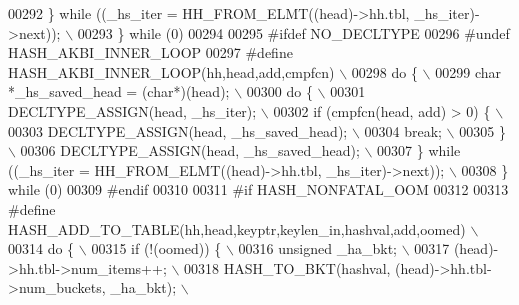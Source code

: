 \begin{DoxyCode}
{{{00292 \textcolor{preprocessor}{  \} while ((\_hs\_iter = HH\_FROM\_ELMT((head)->hh.tbl, \_hs\_iter)->next));           \(\backslash\)}
00293 \textcolor{preprocessor}{\} while (0)}
00294 
00295 \textcolor{preprocessor}{#ifdef NO\_DECLTYPE}
00296 \textcolor{preprocessor}{#undef HASH\_AKBI\_INNER\_LOOP}
00297 \textcolor{preprocessor}{#define HASH\_AKBI\_INNER\_LOOP(hh,head,add,cmpfcn)                                 \(\backslash\)}
00298 \textcolor{preprocessor}{do \{                                                                             \(\backslash\)}
00299 \textcolor{preprocessor}{  char *\_hs\_saved\_head = (char*)(head);                                          \(\backslash\)}
00300 \textcolor{preprocessor}{  do \{                                                                           \(\backslash\)}
00301 \textcolor{preprocessor}{    DECLTYPE\_ASSIGN(head, \_hs\_iter);                                             \(\backslash\)}
00302 \textcolor{preprocessor}{    if (cmpfcn(head, add) > 0) \{                                                 \(\backslash\)}
00303 \textcolor{preprocessor}{      DECLTYPE\_ASSIGN(head, \_hs\_saved\_head);                                     \(\backslash\)}
00304 \textcolor{preprocessor}{      break;                                                                     \(\backslash\)}
00305 \textcolor{preprocessor}{    \}                                                                            \(\backslash\)}
00306 \textcolor{preprocessor}{    DECLTYPE\_ASSIGN(head, \_hs\_saved\_head);                                       \(\backslash\)}
00307 \textcolor{preprocessor}{  \} while ((\_hs\_iter = HH\_FROM\_ELMT((head)->hh.tbl, \_hs\_iter)->next));           \(\backslash\)}
00308 \textcolor{preprocessor}{\} while (0)}
00309 \textcolor{preprocessor}{#endif}
00310 
00311 \textcolor{preprocessor}{#if HASH\_NONFATAL\_OOM}
00312 
00313 \textcolor{preprocessor}{#define HASH\_ADD\_TO\_TABLE(hh,head,keyptr,keylen\_in,hashval,add,oomed)            \(\backslash\)}
00314 \textcolor{preprocessor}{do \{                                                                             \(\backslash\)}
00315 \textcolor{preprocessor}{  if (!(oomed)) \{                                                                \(\backslash\)}
00316 \textcolor{preprocessor}{    unsigned \_ha\_bkt;                                                            \(\backslash\)}
00317 \textcolor{preprocessor}{    (head)->hh.tbl->num\_items++;                                                 \(\backslash\)}
00318 \textcolor{preprocessor}{    HASH\_TO\_BKT(hashval, (head)->hh.tbl->num\_buckets, \_ha\_bkt);                  \(\backslash\)}
}}}
\end{DoxyCode}
